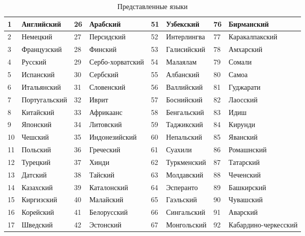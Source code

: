 \documentclass[12pt, twoside]{article}
\begin{document}
\begin{table}[H]
\caption {Представленные языки} \label{tab:title} 
\begin{tabular}{|l|l|l|l|l|l|l|l|}
\hline
1  & Английский    & 26 & Арабский         & 51 & Узбекский     & 76 & Бирманский           \\ \hline
2  & Немецкий      & 27 & Персидский       & 52 & Интерлингва   & 77 & Каракалпакский       \\ \hline
3  & Французский   & 28 & Финский          & 53 & Галисийский   & 78 & Амхарский            \\ \hline
4  & Русский       & 29 & Сербо-хорватский & 54 & Малаялам      & 79 & Сомали               \\ \hline
5  & Испанский     & 30 & Сербский         & 55 & Албанский     & 80 & Самоа                \\ \hline
6  & Итальянский   & 31 & Словенский       & 56 & Валлийский    & 81 & Гуджарати            \\ \hline
7  & Португальский & 32 & Иврит            & 57 & Боснийский    & 82 & Лаосский             \\ \hline
8  & Китайский     & 33 & Африкаанс        & 58 & Бенгальский   & 83 & Идиш                 \\ \hline
9  & Японский      & 34 & Литовский        & 59 & Таджикский    & 84 & Кирунди              \\ \hline
10 & Чешский       & 35 & Индонезийский    & 60 & Непальский    & 85 & Яванский             \\ \hline
11 & Польский      & 36 & Греческий        & 61 & Суахили       & 86 & Ромашнский           \\ \hline
12 & Турецкий      & 37 & Хинди            & 62 & Туркменский   & 87 & Татарский            \\ \hline
13 & Датский       & 38 & Тайский          & 63 & Молдавский    & 88 & Чеченский            \\ \hline
14 & Казахский     & 39 & Каталонский      & 64 & Эсперанто     & 89 & Башкирский           \\ \hline
15 & Киргизский    & 40 & Малайский        & 65 & Гаэльский     & 90 & Чувашский            \\ \hline
16 & Корейский     & 41 & Белорусский      & 66 & Сингальский   & 91 & Аварский             \\ \hline
17 & Шведский      & 42 & Эстонский        & 67 & Монгольский   & 92 & Кабардино-черкесский \\ \hline

\end{tabular}
\end{table}
\end{document}
